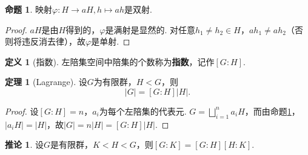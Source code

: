\documentclass[12pt]{ctexart}
\theoremstyle{definition}
\newtheorem{definition}{定义}
\newtheorem{theorem}{定理}
\newtheorem{corollary}{推论}
\newtheorem{proposition}{命题}
\theoremstyle{plain}
\begin{document}
	\begin{proposition}\label{subgroup-bijection}
		映射$\varphi:H\to aH,h\mapsto ah$是双射.
	\end{proposition}
	\begin{proof}
		$aH$是由$H$得到的，$\varphi$是满射是显然的. 对任意$h_1\neq h_2\in H$，$ah_1\neq ah_2$（否则将违反消去律），故$\varphi$是单射.
	\end{proof}
	\begin{definition}[指数]
		左陪集空间中陪集的个数称为\textbf{指数}，记作$\left[G:H\right]$.
	\end{definition}
	\begin{theorem}[Lagrange]
		设$G$为有限群，$H<G$，则
		$$|G|=\left[G:H\right]|H|.$$
	\end{theorem}
	\begin{proof}
		设$\left[G:H\right]=n$，$a_i$为每个左陪集的代表元. $G=\bigsqcup_{i=1}^{n}a_iH$，而由命题\ref{subgroup-bijection}，$|a_iH|=|H|$，故$|G|=n|H|=\left[G:H\right]|H|$.
	\end{proof}
	\begin{corollary}
		设$G$是有限群，$K<H<G$，则$\left[G:K\right]=\left[G:H\right]\left[H:K\right]$.
	\end{corollary}
\end{document}
